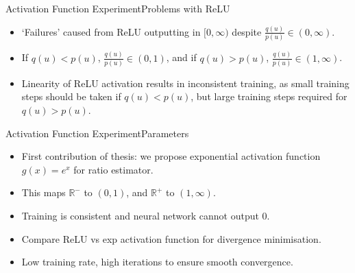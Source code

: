 \documentclass{beamer}
\newcommand{\R}{\mathbb{R}}
\begin{document}
\begin{frame}{Activation Function Experiment}{Problems with ReLU}
\begin{itemize}
\item `Failures' caused from ReLU outputting in $[0,\infty)$ despite $\frac{q(u)}{p(u)}\in (0,\infty)$.
\item If $q(u)<p(u)$, $\frac{q(u)}{p(u)}\in (0,1)$, and if $q(u)>p(u)$, $\frac{q(u)}{p(u)}\in (1,\infty)$.
\item Linearity of ReLU activation results in inconsistent training, as small training steps should be taken if $q(u)<p(u)$, but large training steps required for $q(u)>p(u)$.
\end{itemize}
\end{frame}
\begin{frame}{Activation Function Experiment}{Parameters}
\begin{itemize}
\item First contribution of thesis: we propose exponential activation function $g(x)=e^x$ for ratio estimator.
\item This maps $\R^-$ to $(0,1)$, and $\R^+$ to $(1,\infty)$.
\item Training is consistent and neural network cannot output $0$.
\item Compare ReLU vs exp activation function for divergence minimisation.
\item Low training rate, high iterations to ensure smooth convergence.
\end{itemize}
\end{frame}
\end{document}
